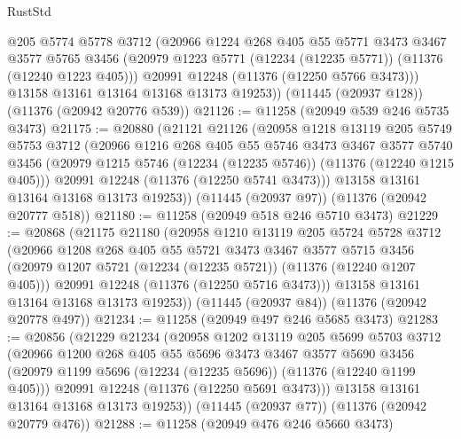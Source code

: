 \begin{lexlean}{RustStd}
\begin{coremodule}
{{{{{{{{{{{{{{{{{{{        @205
        @5774
        @5778
        @3712
        (@20966
          @1224
          @268
          @405
          @55
          @5771
          @3473
          @3467
          @3577
          @5765
          @3456
          (@20979 @1223 @5771 (@12234 (@12235 @5771)) (@11376 (@12240 @1223 @405)))
          @20991
          @12248
          (@11376 (@12250 @5766 @3473)))
        @13158
        @13161
        @13164
        @13168
        @13173
        @19253))
    (@11445 (@20937 @128))
    (@11376 (@20942 @20776 @539))
@21126 := @11258 (@20949 @539 @246 @5735 @3473)
@21175 := @20880
    (@21121
      @21126
      (@20958
        @1218
        @13119
        @205
        @5749
        @5753
        @3712
        (@20966
          @1216
          @268
          @405
          @55
          @5746
          @3473
          @3467
          @3577
          @5740
          @3456
          (@20979 @1215 @5746 (@12234 (@12235 @5746)) (@11376 (@12240 @1215 @405)))
          @20991
          @12248
          (@11376 (@12250 @5741 @3473)))
        @13158
        @13161
        @13164
        @13168
        @13173
        @19253))
    (@11445 (@20937 @97))
    (@11376 (@20942 @20777 @518))
@21180 := @11258 (@20949 @518 @246 @5710 @3473)
@21229 := @20868
    (@21175
      @21180
      (@20958
        @1210
        @13119
        @205
        @5724
        @5728
        @3712
        (@20966
          @1208
          @268
          @405
          @55
          @5721
          @3473
          @3467
          @3577
          @5715
          @3456
          (@20979 @1207 @5721 (@12234 (@12235 @5721)) (@11376 (@12240 @1207 @405)))
          @20991
          @12248
          (@11376 (@12250 @5716 @3473)))
        @13158
        @13161
        @13164
        @13168
        @13173
        @19253))
    (@11445 (@20937 @84))
    (@11376 (@20942 @20778 @497))
@21234 := @11258 (@20949 @497 @246 @5685 @3473)
@21283 := @20856
    (@21229
      @21234
      (@20958
        @1202
        @13119
        @205
        @5699
        @5703
        @3712
        (@20966
          @1200
          @268
          @405
          @55
          @5696
          @3473
          @3467
          @3577
          @5690
          @3456
          (@20979 @1199 @5696 (@12234 (@12235 @5696)) (@11376 (@12240 @1199 @405)))
          @20991
          @12248
          (@11376 (@12250 @5691 @3473)))
        @13158
        @13161
        @13164
        @13168
        @13173
        @19253))
    (@11445 (@20937 @77))
    (@11376 (@20942 @20779 @476))
@21288 := @11258 (@20949 @476 @246 @5660 @3473)
}}}}}}}}}}}}}}}}}}}
\end{coremodule}
\end{lexlean}
